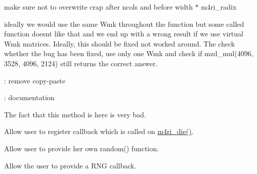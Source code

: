 
\begin{DoxyRefList}
\item[Member \mbox{\hyperlink{strassen_8h_a6ad9c4c4d3ab2ec65f610a17d66cebb0}{\+\_\+mzd\+\_\+addmul\+\_\+even}} (\mbox{\hyperlink{structmzd__t}{mzd\+\_\+t}} $\ast$C, \mbox{\hyperlink{structmzd__t}{mzd\+\_\+t}} const $\ast$A, \mbox{\hyperlink{structmzd__t}{mzd\+\_\+t}} const $\ast$B, int cutoff)]\label{todo__todo000012}%
%
make sure not to overwrite crap after ncols and before width $\ast$ m4ri\+\_\+radix  
\item[Member \mbox{\hyperlink{strassen_8h_a8432a43d231b2aeaf118d21b35d817ce}{\+\_\+mzd\+\_\+mul\+\_\+even}} (\mbox{\hyperlink{structmzd__t}{mzd\+\_\+t}} $\ast$C, \mbox{\hyperlink{structmzd__t}{mzd\+\_\+t}} const $\ast$A, \mbox{\hyperlink{structmzd__t}{mzd\+\_\+t}} const $\ast$B, int cutoff)]\label{todo__todo000011}%
%
ideally we would use the same Wmk throughout the function but some called function doesn\textquotesingle{}t like that and we end up with a wrong result if we use virtual Wmk matrices. Ideally, this should be fixed not worked around. The check whether the bug has been fixed, use only one Wmk and check if mzd\+\_\+mul(4096, 3528, 4096, 2124) still returns the correct answer.  
\item[Member \mbox{\hyperlink{classcore_1_1domain_1_1CartesianSearch_a40aebd1ac557c77a5b52dda0cece8dc7}{core::domain::Cartesian\+Search::Cartesian\+Search}} (std\+::vector$<$ std\+::vector$<$ std\+::vector$<$ Mini\+::\+Lit $>$$>$$>$ const \&cartesian)]\label{todo__todo000001}%
%
\+: remove copy-\/paste  
\item[Member \mbox{\hyperlink{classcore_1_1sat_1_1prop_1_1Prop_afa8ee171af44f985ddda4480cc1036e5}{core::sat::prop::Prop::prop\+\_\+tree}} (vec\+\_\+lit\+\_\+t const \&vars, uint32\+\_\+t head\+\_\+size)=0]\label{todo__todo000017}%
%
\+: documentation  
\item[Member \mbox{\hyperlink{classea_1_1instance_1_1Instance_a597c6255ccc1a074c3b7e96f2382e412}{ea::instance::Instance::num\+\_\+vars}} () const noexcept]\label{todo__todo000002}%
%
The fact that this method is here is very bad.  
\item[Member \mbox{\hyperlink{misc_8h_a99247474582ef8ad10ddabd2be39af61}{m4ri\+\_\+die}} (const char $\ast$errormessage,...)]\label{todo__todo000003}%
%
Allow user to register callback which is called on \mbox{\hyperlink{misc_8h_a99247474582ef8ad10ddabd2be39af61}{m4ri\+\_\+die()}}. 
\item[Member \mbox{\hyperlink{misc_8h_acfff993c60874755b199fec125de613a}{m4ri\+\_\+random\+\_\+word}} ()]\label{todo__todo000005}%
%
Allow user to provide her own random() function.  
\item[Member \mbox{\hyperlink{mzd_8h_a3167fa0d3b20f8a707e1aa98562be7fa}{mzd\+\_\+randomize}} (\mbox{\hyperlink{structmzd__t}{mzd\+\_\+t}} $\ast$M)]\label{todo__todo000010}%
%
Allow the user to provide a R\+NG callback. 
\end{DoxyRefList}